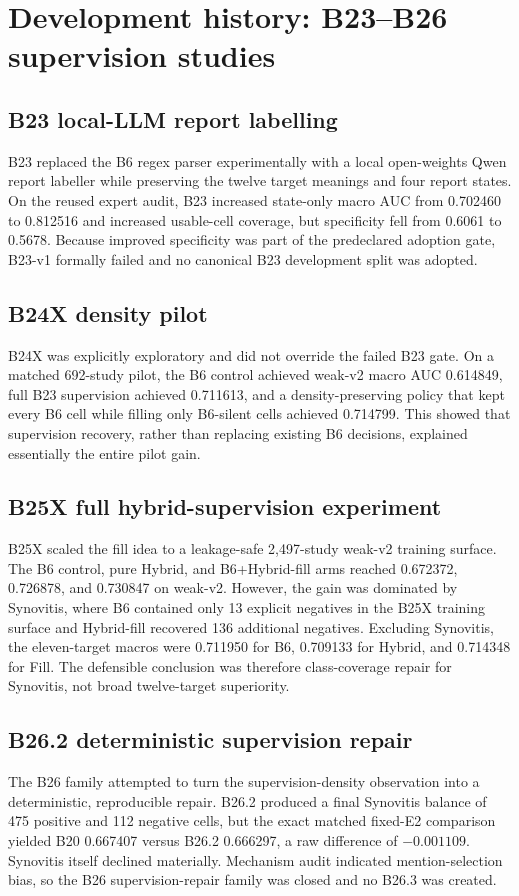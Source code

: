 \documentclass[preprint,12pt]{elsarticle}
\begin{document}
\section{Development history: B23--B26 supervision studies}
\label{sec:b23b26}

\subsection{B23 local-LLM report labelling}
B23 replaced the B6 regex parser experimentally with a local open-weights Qwen report labeller while preserving the twelve target meanings and four report states. On the reused expert audit, B23 increased state-only macro AUC from 0.702460 to 0.812516 and increased usable-cell coverage, but specificity fell from 0.6061 to 0.5678. Because improved specificity was part of the predeclared adoption gate, B23-v1 formally failed and no canonical B23 development split was adopted.

\subsection{B24X density pilot}
B24X was explicitly exploratory and did not override the failed B23 gate. On a matched 692-study pilot, the B6 control achieved weak-v2 macro AUC 0.614849, full B23 supervision achieved 0.711613, and a density-preserving policy that kept every B6 cell while filling only B6-silent cells achieved 0.714799. This showed that supervision recovery, rather than replacing existing B6 decisions, explained essentially the entire pilot gain.

\subsection{B25X full hybrid-supervision experiment}
B25X scaled the fill idea to a leakage-safe 2,497-study weak-v2 training surface. The B6 control, pure Hybrid, and B6+Hybrid-fill arms reached 0.672372, 0.726878, and 0.730847 on weak-v2. However, the gain was dominated by Synovitis, where B6 contained only 13 explicit negatives in the B25X training surface and Hybrid-fill recovered 136 additional negatives. Excluding Synovitis, the eleven-target macros were 0.711950 for B6, 0.709133 for Hybrid, and 0.714348 for Fill. The defensible conclusion was therefore class-coverage repair for Synovitis, not broad twelve-target superiority.

\subsection{B26.2 deterministic supervision repair}
The B26 family attempted to turn the supervision-density observation into a deterministic, reproducible repair. B26.2 produced a final Synovitis balance of 475 positive and 112 negative cells, but the exact matched fixed-E2 comparison yielded B20 0.667407 versus B26.2 0.666297, a raw difference of $-0.001109$. Synovitis itself declined materially. Mechanism audit indicated mention-selection bias, so the B26 supervision-repair family was closed and no B26.3 was created.
\end{document}
